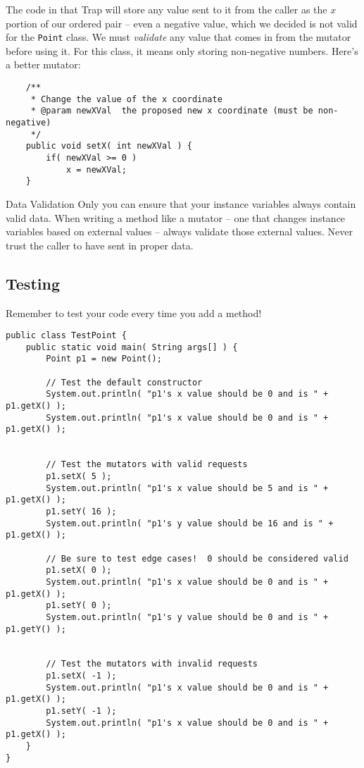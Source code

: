 The code in that Trap will store any value sent to it from the caller as the $x$ portion of our ordered pair -- even a negative value, which we decided is not valid for the \texttt{Point} class.  We must \textit{validate} any value that comes in from the mutator before using it.  For this class, it means only storing non-negative numbers.  Here's a better mutator:

\begin{verbatim}
    /**
     * Change the value of the x coordinate
     * @param newXVal  the proposed new x coordinate (must be non-negative)
     */
    public void setX( int newXVal ) {
        if( newXVal >= 0 )
            x = newXVal;
    }
\end{verbatim}

\begin{tip}{Data Validation}
    Only you can ensure that your instance variables always contain valid data.  When writing a method like a mutator -- one that changes instance variables based on external values -- always validate those external values.  Never trust the caller to have sent in proper data.
\end{tip}

\subsection{Testing}

Remember to test your code every time you add a method!

\begin{verbatim}
public class TestPoint {
    public static void main( String args[] ) {
        Point p1 = new Point();

        // Test the default constructor
        System.out.println( "p1's x value should be 0 and is " + p1.getX() );
        System.out.println( "p1's x value should be 0 and is " + p1.getX() );


        // Test the mutators with valid requests
        p1.setX( 5 );
        System.out.println( "p1's x value should be 5 and is " + p1.getX() );
        p1.setY( 16 );
        System.out.println( "p1's y value should be 16 and is " + p1.getX() );

        // Be sure to test edge cases!  0 should be considered valid
        p1.setX( 0 );
        System.out.println( "p1's x value should be 0 and is " + p1.getX() );
        p1.setY( 0 );
        System.out.println( "p1's y value should be 0 and is " + p1.getY() );


        // Test the mutators with invalid requests
        p1.setX( -1 );
        System.out.println( "p1's x value should be 0 and is " + p1.getX() );
        p1.setY( -1 );
        System.out.println( "p1's x value should be 0 and is " + p1.getX() );
    }
}
\end{verbatim}

